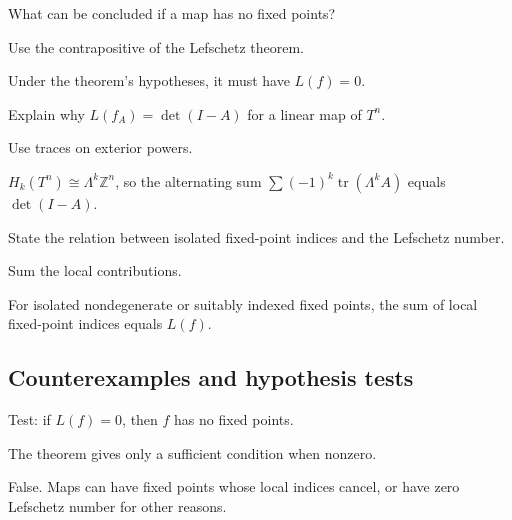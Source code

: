 \begin{exercise}\label{exr:viii35-ped-07}
What can be concluded if a map has no fixed points?
\end{exercise}
\begin{hint}
Use the contrapositive of the Lefschetz theorem.
\end{hint}
\begin{solution}
Under the theorem's hypotheses, it must have $L(f)=0$.
\end{solution}

\begin{exercise}\label{exr:viii35-ped-08}
Explain why $L(f_A)=\det(I-A)$ for a linear map of $T^n$.
\end{exercise}
\begin{hint}
Use traces on exterior powers.
\end{hint}
\begin{solution}
$H_k(T^n)\cong\Lambda^k\mathbb Z^n$, so the alternating sum $\sum(-1)^k\operatorname{tr}(\Lambda^kA)$ equals $\det(I-A)$.
\end{solution}

\begin{exercise}\label{exr:viii35-ped-09}
State the relation between isolated fixed-point indices and the Lefschetz number.
\end{exercise}
\begin{hint}
Sum the local contributions.
\end{hint}
\begin{solution}
For isolated nondegenerate or suitably indexed fixed points, the sum of local fixed-point indices equals $L(f)$.
\end{solution}

\subsection*{Counterexamples and hypothesis tests}

\begin{exercise}[L=0 means no fixed point]\label{exr:viii35-ped-10}
Test: if $L(f)=0$, then $f$ has no fixed points.
\end{exercise}
\begin{hint}
The theorem gives only a sufficient condition when nonzero.
\end{hint}
\begin{solution}
False. Maps can have fixed points whose local indices cancel, or have zero Lefschetz number for other reasons.
\end{solution}

